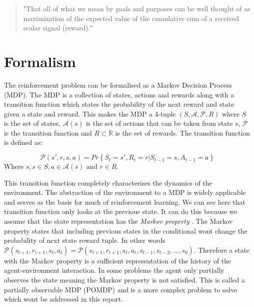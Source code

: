 \begin{quote}
    "That all of what we mean by goals and purposes can be well thought of as maximization of the expected value of the cumulative sum of a received scalar signal (reward)." 
    \cite{suttonReinforcementLearningSecond2018}
    \label{quote:reward}
\end{quote}

\section{Formalism}

The reinforcement problem can be formalised as a Markov Decision Process (MDP). The MDP is a collection of states, actions and rewards along with a transition function which states the probability of the next reward and state given a state and reward. This makes the MDP a 4-tuple $(S,\mathcal{A}, \mathcal{P}, R)$ where $S$ is the set of states, $\mathcal{A}(s)$ is the set of actions that can be taken from state $s$, $\mathcal{P}$ is the transition function and $R \subset \mathbb{R}$ is the set of rewards. The transition function is defined as:

\begin{equation}
\mathcal{P}(s',r, s,a) = Pr\left\{ S_{t}=s', R_{t}=r | S_{t-1}=s, A_{t-1}=a \right\}
\label{eq:transition}
\end{equation}
Where $s,s \in S, a \in \mathcal{A}(s) \text{ and } r \in R$.

This transition function completely characterises the dynamics of the environment. The abstraction of the environment to a MDP is widely applicable and serves as the basis for much of reinforcement learning. We can see here that transition function only looks at the previous state. It can do this because we assume that the state representation has the \textit{Markov property} \cite{suttonReinforcementLearningSecond2018}. The Markov property states that including previous states in the conditional wont change the probability of next state reward tuple. In other words $\mathcal{P}(s_{t+1}, r_{t+1}, s_{t},a_{t}) = \mathcal{P}(s_{t+1}, r_{t+1}, s_{t},a_{t}, s_{t-1}, s_{t-2}, ... , s_{0})$. Therefore a state with the Markov property is a sufficient representation of the history of the agent-environment interaction. In some problems the agent only partially observes the state meaning the Markov property is not satisfied. This is called a partially observable MDP (POMDP) and is a more complex problem to solve which wont be addressed in this report.

